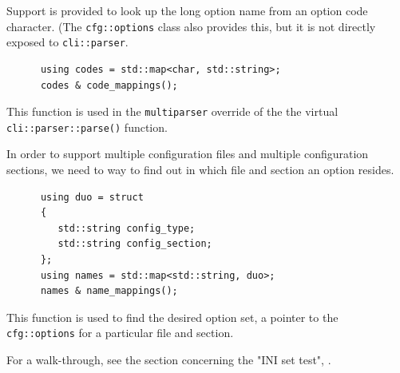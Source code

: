    Support is provided to look up the long option name from an option code
   character. (The \texttt{cfg::options} class also provides this, but it
   is not directly exposed to \texttt{cli::parser}.

   \begin{verbatim}
      using codes = std::map<char, std::string>;
      codes & code_mappings();
   \end{verbatim}

   This function is used in the \texttt{multiparser} override of the
   the virtual \texttt{cli::parser::parse()} function.

   In order to support multiple configuration files and multiple
   configuration sections, we need to way to find out in which file and section
   an option resides.

   \begin{verbatim}
      using duo = struct
      {
         std::string config_type;
         std::string config_section;
      };
      using names = std::map<std::string, duo>;
      names & name_mappings();
   \end{verbatim}

   This function is used to find the desired option set, a pointer to
   the \texttt{cfg::options} for a particular file and section.

   For a walk-through, see the section concerning the "INI set test",
   .

